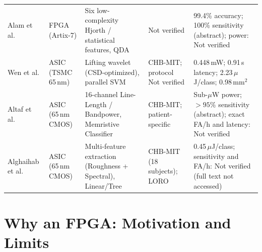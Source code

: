 \documentclass[10pt,twocolumn,letterpaper]{article}
\begin{document}
\begin{table}[t]
\begin{tabularx}{\textwidth}{@{}p{1.9cm}p{2.3cm}XXX@{}}
Alam et al. \cite{alam2024qda} & FPGA (Artix-7)
  & Six low-complexity Hjorth / statistical features, QDA
  & Not verified
  & 99.4\% accuracy; 100\% sensitivity (abstract); power: Not verified \\
Wen et al. \cite{wen2022asic} & ASIC (TSMC 65\,nm)
  & Lifting wavelet (CSD-optimized), parallel SVM
  & CHB-MIT; protocol Not verified
  & 0.448\,mW; 0.91\,s latency; 2.23\,$\mu$J/class; 0.98\,mm$^2$ \\
{\color{blue} Altaf et al.\ \cite{altaf2015biomedical}} & {\color{blue} ASIC (65\,nm CMOS)}
  & {\color{blue} 16-channel Line-Length / Bandpower, Memristive Classifier}
  & {\color{blue} CHB-MIT; patient-specific}
  & {\color{blue} Sub-$\mu$W power; $>95\%$ sensitivity (abstract); exact FA/h and latency: Not verified} \\
{\color{blue} Alghaihab et al.\ \cite{alghaihab2022energy}} & {\color{blue} ASIC (65\,nm CMOS)}
  & {\color{blue} Multi-feature extraction (Roughness + Spectral), Linear/Tree}
  & {\color{blue} CHB-MIT (18 subjects); LORO}
  & {\color{blue} 0.45\,$\mu$J/class; sensitivity and FA/h: Not verified (full text not accessed)} \\
\bottomrule
\end{tabularx}
\end{table}

\section{Why an FPGA: Motivation and Limits}
\label{sec:fpga}
\end{document}
